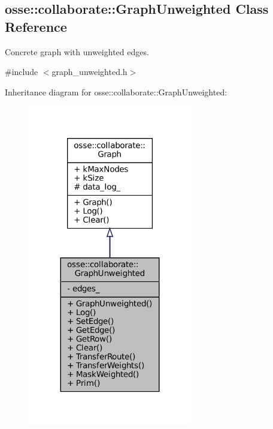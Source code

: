 \hypertarget{classosse_1_1collaborate_1_1_graph_unweighted}{}\subsection{osse\+:\+:collaborate\+:\+:Graph\+Unweighted Class Reference}
\label{classosse_1_1collaborate_1_1_graph_unweighted}


Concrete graph with unweighted edges.  




{\ttfamily \#include $<$graph\+\_\+unweighted.\+h$>$}



Inheritance diagram for osse\+:\+:collaborate\+:\+:Graph\+Unweighted\+:
\nopagebreak
\begin{figure}[H]
\begin{center}
\leavevmode
\includegraphics[width=203pt]{classosse_1_1collaborate_1_1_graph_unweighted__inherit__graph}
\end{center}
\end{figure}
